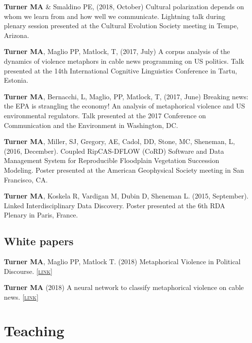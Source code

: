 \documentclass[11pt, letterpaper]{article}
\newcommand{\lurl}[1]{\href{#1}{\scriptsize\textsc{[link]}}}
\begin{document}
  \textbf{Turner MA} \& Smaldino PE, (2018, October) Cultural polarization depends on whom we learn from and how well we communicate. Lightning talk during plenary session presented at the Cultural Evolution Society meeting in Tempe, Arizona.

  \textbf{Turner MA}, Maglio PP, Matlock, T, (2017, July) A corpus analysis of the dynamics of violence metaphors in cable news programming on US politics. Talk presented at the 14th International Cognitive Linguistics Conference in Tartu, Estonia.

  \textbf{Turner MA}, Bernacchi, L, Maglio, PP, Matlock, T, (2017, June) Breaking
  news: the EPA is strangling the economy! An analysis of metaphorical violence
  and US environmental regulators. Talk presented at the 2017 Conference on
  Communication and the Environment in Washington, DC.

  \textbf{Turner MA}, Miller, SJ, Gregory, AE, Cadol, DD, Stone, MC, Sheneman, L, (2016, December). Coupled RipCAS-DFLOW (CoRD) Software and Data Management System for Reproducible Floodplain Vegetation Succession Modeling. Poster presented at the American Geophysical Society meeting in San Francisco, CA.

  \textbf{Turner MA}, Koskela R, Vardigan M, Dubin D, Sheneman L. (2015, September). Linked Interdisciplinary Data Discovery. Poster presented at the 6th RDA Plenary in Paris, France. 


\subsection{White papers}

  \textbf{Turner MA}, Maglio PP, Matlock T. (2018) Metaphorical Violence in Political Discourse. 
  \lurl{https://doi.org/10.31235/osf.io/t8yg9}

  \textbf{Turner MA} (2018) A neural network to classify metaphorical violence
  on cable news. \lurl{https://arxiv.org/abs/1810.08677}


\section*{Teaching}
\end{document}
